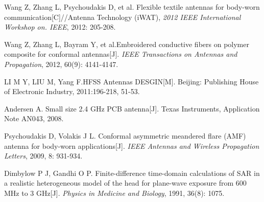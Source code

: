 \documentclass[journal]{IEEEtran}
\begin{document}
\begin{thebibliography}{1}
Wang Z, Zhang L, Psychoudakis D, et al. Flexible textile antennas for body-worn communication[C]//Antenna Technology (iWAT), \emph{2012 IEEE International Workshop on. IEEE}, 2012: 205-208.

Wang Z, Zhang L, Bayram Y, et al.Embroidered conductive fibers on polymer composite for conformal antennas[J]. \emph{IEEE Transactions on Antennas and Propagation}, 2012, 60(9): 4141-4147.

LI M Y, LIU M, Yang F.HFSS Antennas DESGIN[M]. Beijing: Publishing House of Electronic Industry, 2011:196-218, 51-53.

Andersen A. Small size 2.4 GHz PCB antenna[J]. Texas Instruments, Application Note AN043, 2008.

Psychoudakis D, Volakis J L. Conformal asymmetric meandered flare (AMF) antenna for body-worn applications[J].
\emph{IEEE Antennas and Wireless Propagation Letters}, 2009, 8: 931-934.

Dimbylow P J, Gandhi O P. Finite-difference time-domain calculations of SAR in a realistic heterogeneous model of the head for plane-wave exposure from 600 MHz to 3 GHz[J]. \emph{Physics in Medicine and Biology}, 1991, 36(8): 1075.
\end{thebibliography}
\end{document}
